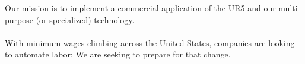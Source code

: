 Our mission is to implement a commercial application of the UR5 and our multi-purpose (or specialized) \productname{} technology.\\ \\ With minimum wages climbing across the United States, companies are looking to automate labor; We are seeking to prepare for that change. 
